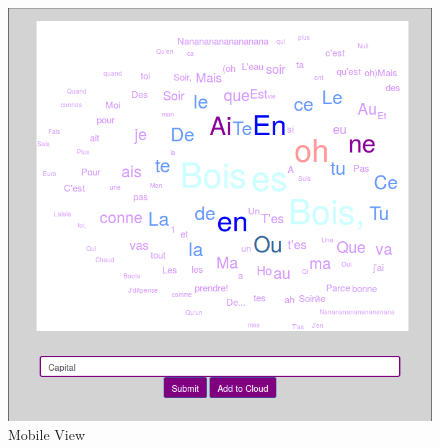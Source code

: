 \documentclass[]{article}
\begin{document}
\begin{figure}[htbp]
\centering
\includegraphics{mobile.png}
\caption{Mobile View}
\end{figure}
\end{document}
